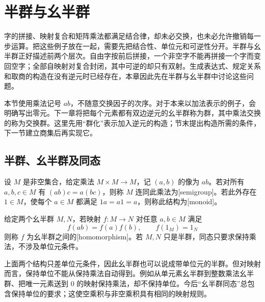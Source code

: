 
\section{半群与幺半群}
\label{b1:sec:0102}

%
%

字的拼接、映射复合和矩阵乘法都满足结合律，却未必交换，也未必允许撤销每一步运算。把这些例子放在一起，需要先把结合性、单位元和可逆性分开。半群与幺半群正好描述前两个层次。自由字按前后拼接，一个非空字不能再拼接一个字而变回空字；全部自映射对复合封闭，其中可逆的却只有双射。生成表达式、规定关系和取商的构造在没有逆元时已经存在，本章因此先在半群与幺半群中讨论这些问题。

\ProseParagraphBreak
本节使用乘法记号 \(ab\)，不随意交换因子的次序。对于本来以加法表示的例子，会明确写出零元。下一章将把每个元素都有双边逆元的幺半群称为群，其中乘法交换的称为交换群。这里先用“群化”表示加入逆元的构造；节末提出构造所需的条件，下一节建立商集后再实现它。

\subsection{半群、幺半群及同态}
\label{b1:subsec:0102:01}

\begin{definition}\label{b1:def:monoid}
	设 \(M\) 是非空集合，给定乘法 \(M\times M\rightarrow M\)，记 \((a,b)\) 的像为 \(ab\)。若对所有 \(a,b,c\in M\) 有 \((ab)c=a(bc)\)，则称 \(M\) 连同此乘法为[semigroup]。若此外存在 \(1\in M\)，使每个 \(a\in M\) 都满足 \(1a=a1=a\)，则称此结构为[monoid]。

	给定两个幺半群 \(M,N\)，若映射 \(f:M\rightarrow N\) 对任意 \(a,b\in M\) 满足
	\[
		f(ab)=f(a)f(b),\qquad f(1_M)=1_N
	\]
	则称 \(f\) 为幺半群之间的[homomorphism]。若 \(M,N\) 只是半群，同态只要求保持乘法，不涉及单位元条件。
\end{definition}

上面两个结构只差单位元条件，因此幺半群也可以说成带单位元的半群。但对映射而言，保持单位不能从保持乘法自动得到。例如从单元素幺半群到整数乘法幺半群、把唯一元素送到 \(0\) 的映射保持乘法，却不保持单位。今后“幺半群同态”总包含保持单位的要求；这使空乘积与非空乘积具有相同的映射规则。

